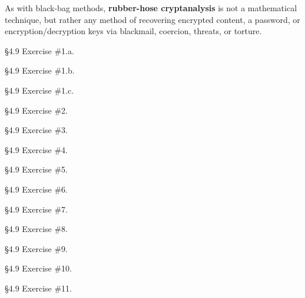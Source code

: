 			As with black-bag methods, {\bf rubber-hose cryptanalysis}  is not a mathematical technique, but rather any method of recovering encrypted content, a password, or encryption/decryption keys via blackmail, coercion, threats, or torture.


\begin{problem} [15 points]
\S 4.9 Exercise \#1.a.
\end{problem}

\begin{problem} [15 points]
\S 4.9 Exercise \#1.b.
\end{problem}

\begin{problem} [15 points]
\S 4.9 Exercise \#1.c.
\end{problem}

\begin{problem} [10 points]
\S 4.9 Exercise \#2.
\end{problem}

\begin{problem} [15 points]
\S 4.9 Exercise \#3.
\end{problem}

\begin{problem} [15 points]
\S 4.9 Exercise \#4.
\end{problem}

\begin{problem} [15 points]
\S 4.9 Exercise \#5.
\end{problem}

\begin{problem} [15 points]
\S 4.9 Exercise \#6.
\end{problem}

\begin{problem} [15 points]
\S 4.9 Exercise \#7.
\end{problem}

\begin{problem} [10 points]
\S 4.9 Exercise \#8.
\end{problem}

\begin{problem} [15 points]
\S 4.9 Exercise \#9.
\end{problem}

\begin{problem} [10 points]
\S 4.9 Exercise \#10.
\end{problem}

\begin{problem} [10 points]
\S 4.9 Exercise \#11.
\end{problem}

